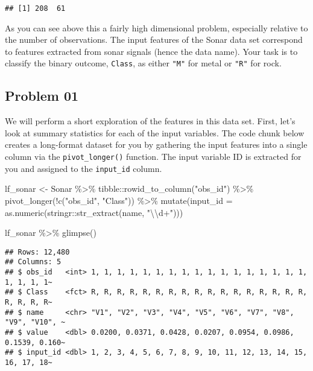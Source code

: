 \documentclass[
]{article}
\newenvironment{Shaded}{\begin{snugshade}}{\end{snugshade}}
\newcommand{\AttributeTok}[1]{\textcolor[rgb]{0.77,0.63,0.00}{#1}}
\newcommand{\FunctionTok}[1]{\textcolor[rgb]{0.00,0.00,0.00}{#1}}
\newcommand{\NormalTok}[1]{#1}
\newcommand{\OtherTok}[1]{\textcolor[rgb]{0.56,0.35,0.01}{#1}}
\newcommand{\SpecialCharTok}[1]{\textcolor[rgb]{0.00,0.00,0.00}{#1}}
\newcommand{\StringTok}[1]{\textcolor[rgb]{0.31,0.60,0.02}{#1}}
\begin{document}
\begin{verbatim}
## [1] 208  61
\end{verbatim}

As you can see above this a fairly high dimensional problem, especially
relative to the number of observations. The input features of the Sonar
data set correspond to features extracted from sonar signals (hence the
data name). Your task is to classify the binary outcome, \texttt{Class},
as either \texttt{"M"} for metal or \texttt{"R"} for rock.

\hypertarget{problem-01}{%
\subsection{Problem 01}\label{problem-01}}

We will perform a short exploration of the features in this data set.
First, let's look at summary statistics for each of the input variables.
The code chunk below creates a long-format dataset for you by gathering
the input features into a single column via the \texttt{pivot\_longer()}
function. The input variable ID is extracted for you and assigned to the
\texttt{input\_id} column.

\begin{Shaded}
\begin{Highlighting}[]
\NormalTok{lf\_sonar }\OtherTok{\textless{}{-}}\NormalTok{ Sonar }\SpecialCharTok{\%\textgreater{}\%} 
\NormalTok{  tibble}\SpecialCharTok{::}\FunctionTok{rowid\_to\_column}\NormalTok{(}\StringTok{"obs\_id"}\NormalTok{) }\SpecialCharTok{\%\textgreater{}\%} 
  \FunctionTok{pivot\_longer}\NormalTok{(}\SpecialCharTok{!}\FunctionTok{c}\NormalTok{(}\StringTok{"obs\_id"}\NormalTok{, }\StringTok{"Class"}\NormalTok{)) }\SpecialCharTok{\%\textgreater{}\%} 
  \FunctionTok{mutate}\NormalTok{(}\AttributeTok{input\_id =} \FunctionTok{as.numeric}\NormalTok{(stringr}\SpecialCharTok{::}\FunctionTok{str\_extract}\NormalTok{(name, }\StringTok{"}\SpecialCharTok{\textbackslash{}\textbackslash{}}\StringTok{d+"}\NormalTok{)))}

\NormalTok{lf\_sonar }\SpecialCharTok{\%\textgreater{}\%} \FunctionTok{glimpse}\NormalTok{()}
\end{Highlighting}
\end{Shaded}

\begin{verbatim}
## Rows: 12,480
## Columns: 5
## $ obs_id   <int> 1, 1, 1, 1, 1, 1, 1, 1, 1, 1, 1, 1, 1, 1, 1, 1, 1, 1, 1, 1, 1~
## $ Class    <fct> R, R, R, R, R, R, R, R, R, R, R, R, R, R, R, R, R, R, R, R, R~
## $ name     <chr> "V1", "V2", "V3", "V4", "V5", "V6", "V7", "V8", "V9", "V10", ~
## $ value    <dbl> 0.0200, 0.0371, 0.0428, 0.0207, 0.0954, 0.0986, 0.1539, 0.160~
## $ input_id <dbl> 1, 2, 3, 4, 5, 6, 7, 8, 9, 10, 11, 12, 13, 14, 15, 16, 17, 18~
\end{verbatim}
\end{document}
